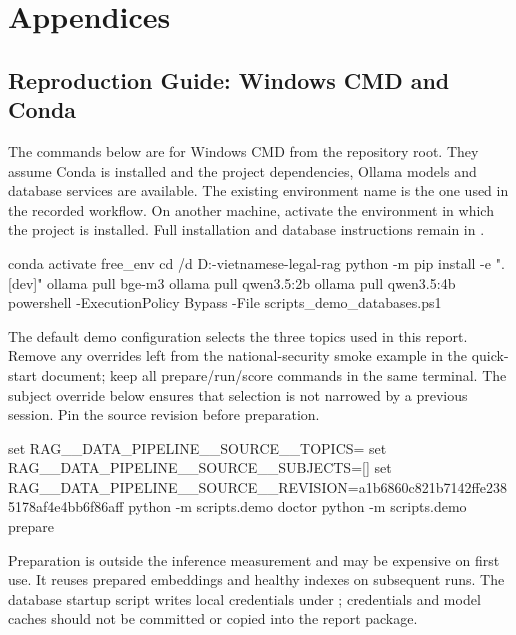 \chapter{Appendices}\label{ch:appendices}
\section{Reproduction Guide: Windows CMD and Conda}
The commands below are for Windows CMD from the repository root. They assume Conda is installed and the project dependencies, Ollama models and database services are available. The existing environment name  is the one used in the recorded workflow. On another machine, activate the environment in which the project is installed. Full installation and database instructions remain in .

\begin{commands}
conda activate free_env
cd /d D:\dsp-vietnamese-legal-rag
python -m pip install -e ".[dev]"
ollama pull bge-m3
ollama pull qwen3.5:2b
ollama pull qwen3.5:4b
powershell -ExecutionPolicy Bypass -File scripts\start_demo_databases.ps1
\end{commands}
The default demo configuration selects the three topics used in this report. Remove any overrides left from the national-security smoke example in the quick-start document; keep all prepare/run/score commands in the same terminal. The subject override below ensures that selection is not narrowed by a previous session. Pin the source revision before preparation.
\begin{commands}
set RAG__DATA_PIPELINE__SOURCE__TOPICS=
set RAG__DATA_PIPELINE__SOURCE__SUBJECTS=[]
set RAG__DATA_PIPELINE__SOURCE__REVISION=a1b6860c821b7142ffe2385178af4e4bb6f86aff
python -m scripts.demo doctor
python -m scripts.demo prepare
\end{commands}
Preparation is outside the inference measurement and may be expensive on first use. It reuses prepared embeddings and healthy indexes on subsequent runs. The database startup script writes local credentials under ; credentials and model caches should not be committed or copied into the report package.

